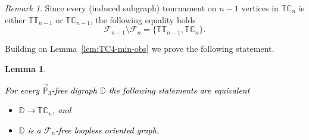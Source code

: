 \documentclass{article}
\newtheorem{lemma}[theorem]{Lemma}
\theoremstyle{definition}
\theoremstyle{remark}
\newtheorem{remark}[theorem]{Remark}
\newcommand{\blue}[1]{\textcolor{black}{#1}}
\newcommand{\bC}{{\mathbb C}}
\newcommand{\bD}{{\mathbb D}}
\newcommand{\bP}{{\mathbb P}}
\newcommand{\bT}{{\mathbb T}}
\newcommand{\calF}{{\mathcal F}}
\begin{document}
\begin{remark}\label{rmk:Fn}
    Since every (induced subgraph) tournament on $n-1$ vertices in $\bT\bC_n$ is either $\bT\bT_{n-1}$ or $\bT\bC_{n-1}$,
    the following equality holds
    \[
    \calF_{n-1}\setminus \calF_n = \{\bT\bT_{n-1},\bT\bC_n\}.
    \]
\end{remark}

Building on Lemma~\ref{lem:TC4-min-obs} we prove the following statement.

\begin{lemma}\label{lem:TCn-min-obs}
\blue{For every  $\vec{\bP}_3$-free digraph $\bD$ the following statements are equivalent
\begin{itemize}
    \item $\bD\to \bT\bC_n$, and
    \item $\bD$ is a $\calF_n$-free loopless oriented graph.
\end{itemize}}
\end{lemma}
\end{document}
